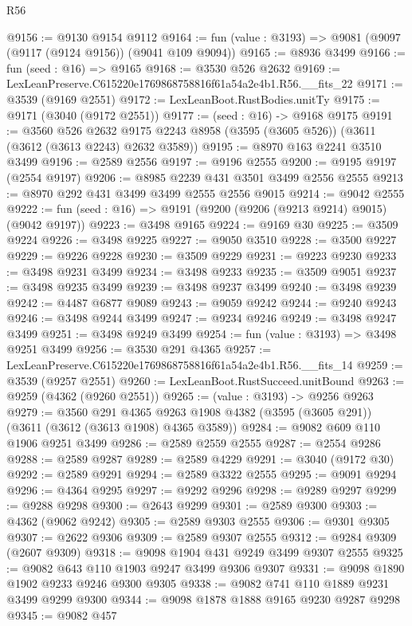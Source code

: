 \begin{lexlean}{R56}
\begin{coremodule}
@9156 := @9130 @9154 @9112
@9164 := fun (value : @3193) => @9081 (@9097 (@9117 (@9124 @9156)) (@9041 @109 @9094))
@9165 := @8936 @3499
@9166 := fun (seed : @16) => @9165
@9168 := @3530 @526 @2632
@9169 := LexLeanPreserve.C615220e1769868758816f61a54a2e4b1.R56.__fits_22
@9171 := @3539 (@9169 @2551)
@9172 := LexLeanBoot.RustBodies.unitTy
@9175 := @9171 (@3040 (@9172 @2551))
@9177 := (seed : @16) -> @9168 @9175
@9191 := @3560
    @526
    @2632
    @9175
    @2243
    @8958
    (@3595 (@3605 @526))
    (@3611 (@3612 (@3613 @2243) @2632 @3589))
@9195 := @8970 @163 @2241 @3510 @3499
@9196 := @2589 @2556
@9197 := @9196 @2555
@9200 := @9195 @9197 (@2554 @9197)
@9206 := @8985 @2239 @431 @3501 @3499 @2556 @2555
@9213 := @8970 @292 @431 @3499 @3499 @2555 @2556 @9015
@9214 := @9042 @2555
@9222 := fun (seed : @16) => @9191 (@9200 (@9206 (@9213 @9214) @9015) (@9042 @9197))
@9223 := @3498 @9165
@9224 := @9169 @30
@9225 := @3509 @9224
@9226 := @3498 @9225
@9227 := @9050 @3510
@9228 := @3500 @9227
@9229 := @9226 @9228
@9230 := @3509 @9229
@9231 := @9223 @9230
@9233 := @3498 @9231 @3499
@9234 := @3498 @9233
@9235 := @3509 @9051
@9237 := @3498 @9235 @3499
@9239 := @3498 @9237 @3499
@9240 := @3498 @9239
@9242 := @4487 @6877 @9089
@9243 := @9059 @9242
@9244 := @9240 @9243
@9246 := @3498 @9244 @3499
@9247 := @9234 @9246
@9249 := @3498 @9247 @3499
@9251 := @3498 @9249 @3499
@9254 := fun (value : @3193) => @3498 @9251 @3499
@9256 := @3530 @291 @4365
@9257 := LexLeanPreserve.C615220e1769868758816f61a54a2e4b1.R56.__fits_14
@9259 := @3539 (@9257 @2551)
@9260 := LexLeanBoot.RustSucceed.unitBound
@9263 := @9259 (@4362 (@9260 @2551))
@9265 := (value : @3193) -> @9256 @9263
@9279 := @3560
    @291
    @4365
    @9263
    @1908
    @4382
    (@3595 (@3605 @291))
    (@3611 (@3612 (@3613 @1908) @4365 @3589))
@9284 := @9082 @609 @110 @1906 @9251 @3499
@9286 := @2589 @2559 @2555
@9287 := @2554 @9286
@9288 := @2589 @9287
@9289 := @2589 @4229
@9291 := @3040 (@9172 @30)
@9292 := @2589 @9291
@9294 := @2589 @3322 @2555
@9295 := @9091 @9294
@9296 := @4364 @9295
@9297 := @9292 @9296
@9298 := @9289 @9297
@9299 := @9288 @9298
@9300 := @2643 @9299
@9301 := @2589 @9300
@9303 := @4362 (@9062 @9242)
@9305 := @2589 @9303 @2555
@9306 := @9301 @9305
@9307 := @2622 @9306
@9309 := @2589 @9307 @2555
@9312 := @9284 @9309 (@2607 @9309)
@9318 := @9098 @1904 @431 @9249 @3499 @9307 @2555
@9325 := @9082 @643 @110 @1903 @9247 @3499 @9306 @9307
@9331 := @9098 @1890 @1902 @9233 @9246 @9300 @9305
@9338 := @9082 @741 @110 @1889 @9231 @3499 @9299 @9300
@9344 := @9098 @1878 @1888 @9165 @9230 @9287 @9298
@9345 := @9082 @457

\end{coremodule}
\end{lexlean}
